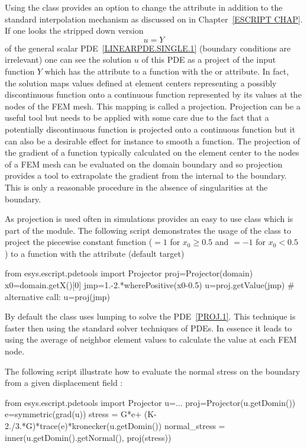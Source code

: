 Using the \LinearPDE class provides an option to change the \FunctionSpace attribute in addition
to the standard interpolation mechanism as
discussed on in Chapter~\ref{ESCRIPT CHAP}. If one looks the
stripped down version 
\begin{equation}\label{PROJ.1}
u = Y
\end{equation}
of the general scalar PDE~\ref{LINEARPDE.SINGLE.1} (boundary conditions are irrelevant) 
one can see the solution $u$ of this PDE as a project of the input function $Y$
which has the \Function attribute to a function with the \SolutionFS or \ReducedSolutionFS
attribute. In fact, the solution maps values defined at 
element centers representing a possibly discontinuous function 
onto a continuous function represented by its values at the nodes of the FEM mesh. 
This mapping is called a projection. Projection 
can be a useful tool but needs to be applied with some care due to the fact that
a potentially discontinuous function is projected onto a continuous function but it can
also be a desirable effect for instance to smooth a function. The projection of the
gradient of a function typically calculated on the element center to the 
nodes of a FEM mesh can be evaluated on the domain boundary and so projection provides a tool to extrapolate 
the gradient from the internal to the boundary. This is only a reasonable procedure in the absence of singularities at the boundary. 

As projection is used often in simulations \escript provides an easy to use class 
which is part of the \pdetools module. The following script demonstrates
the usage of the class to project the piecewise constant function ($=1$ for $x_{0}\ge 0.5$ and
$=-1$ for $x_{0}<0.5$ ) to a function with the \ReducedSolutionFS attribute (default target) 
\begin{python}
from esys.escript.pdetools import Projector
proj=Projector(domain)
x0=domain.getX()[0]
jmp=1.-2.*wherePositive(x0-0.5)
u=proj.getValue(jmp)
# alternative call:
u=proj(jmp)
\end{python}
By default the class uses lumping to solve the PDE~\ref{PROJ.1}. This technique is faster
then using the standard solver techniques of PDEs. In essence it leads to using the average of
neighbor element values to calculate the value at each FEM node. 

The following script illustrate how to evaluate the normal stress
on the boundary from a given displacement field :
\begin{python}
from esys.escript.pdetools import Projector
u=...
proj=Projector(u.getDomin())
e=symmetric(grad(u))
stress = G*e+ (K-2./3.*G)*trace(e)*kronecker(u.getDomin())
normal_stress = inner(u.getDomin().getNormal(), proj(stress))
\end{python}



